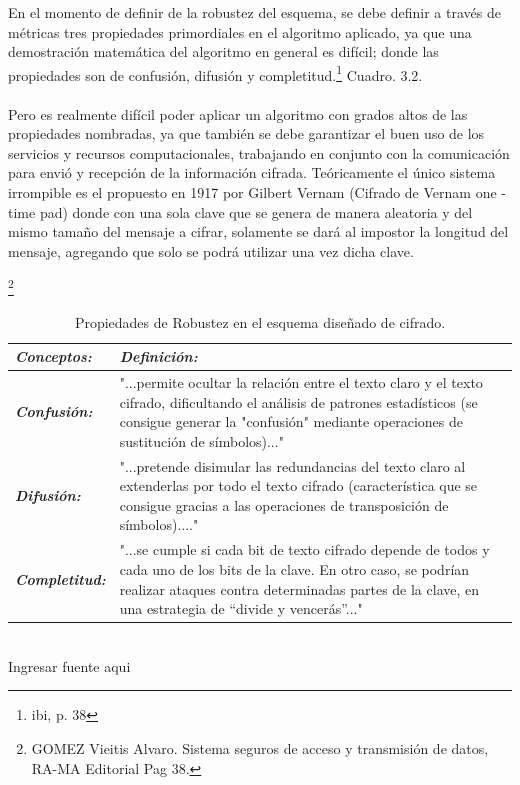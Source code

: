 \documentclass[a4paper,openright,12pt]{book}
\theoremstyle{definition}
\theoremstyle{remark}
\begin{document}
En el momento de definir de la robustez del esquema, se debe definir a través de métricas tres propiedades primordiales en el algoritmo aplicado, ya que una demostración matemática del algoritmo en general es difícil; donde las propiedades son de confusión, difusión y completitud.\footnote{ibi, p. 38} Cuadro. 3.2.\\\\
Pero es realmente difícil poder aplicar un algoritmo con grados altos de las propiedades nombradas, ya que también se debe garantizar el buen uso de los servicios y recursos computacionales, trabajando en conjunto con la comunicación para envió y recepción de la información cifrada. Teóricamente el único sistema irrompible es el propuesto en 1917 por Gilbert Vernam (Cifrado de Vernam one - time pad) donde con una sola clave que se genera de manera aleatoria y del mismo tamaño del mensaje a cifrar, solamente se dará al impostor la longitud del mensaje, agregando que solo se podrá utilizar una vez dicha clave.

\begin{table}[ht]
\centering
\caption{Propiedades de Robustez en el esquema diseñado de cifrado.}\footnote{GOMEZ Vieitis Alvaro. Sistema seguros de acceso y transmisión de datos, RA-MA Editorial Pag 38.}
\begin{tabular}{>{\centering\arraybackslash}m{3cm} >{\arraybackslash}m{10cm} }
\hline
\textbf{\textit{Conceptos:}} & \textbf{\textit{Definición:}} \\ \hline
\textbf{\textit{Confusión:}} & "...permite ocultar la relación entre el texto claro y el texto cifrado, dificultando el análisis de patrones estadísticos (se consigue generar la "confusión" mediante operaciones de sustitución de símbolos)..." \\ \hline
\textbf{\textit{Difusión:}} & "...pretende disimular las redundancias del texto claro al extenderlas por todo el texto cifrado (característica que se consigue gracias a las operaciones de transposición de símbolos)...." \\ \hline
\textbf{\textit{Completitud:}} & "...se cumple si cada bit de texto cifrado depende de todos y cada uno de los bits de la clave. En otro caso, se podrían realizar ataques contra determinadas partes de la clave, en una estrategia de “divide y vencerás”..." \\ \hline
\end{tabular}
\label{tabla:RobustezPropiedades}
\\Ingresar fuente aqui
\end{table}
\end{document}
